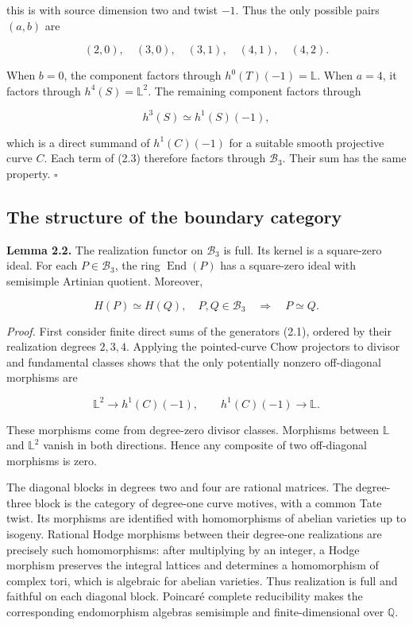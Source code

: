 \documentclass[11pt,a4paper]{article}
\begin{document}
this is \cite[Theorem 1.4(ii), equation (3)]{FV21} with source dimension two and twist $-1$. Thus the only possible pairs $(a,b)$ are

\begin{equation*}
(2,0),\quad(3,0),\quad(3,1),\quad(4,1),\quad(4,2).
\end{equation*}

When $b=0$, the component factors through $h^0(T)(-1)=\mathbb L$. When $a=4$, it factors through $h^4(S)=\mathbb L^2$. The remaining component factors through

\begin{equation*}
h^3(S)\simeq h^1(S)(-1),
\end{equation*}

which is a direct summand of $h^1(C)(-1)$ for a suitable smooth projective curve $C$. Each term of (2.3) therefore factors through $\mathcal B_3$. Their sum has the same property. $\square$

\subsection{The structure of the boundary category}

\noindent \textbf{Lemma 2.2.} The realization functor on $\mathcal B_3$ is full. Its kernel is a square-zero ideal. For each $P\in\mathcal B_3$, the ring $\operatorname{End}(P)$ has a square-zero ideal with semisimple Artinian quotient. Moreover,

\begin{equation*}
H(P)\simeq H(Q),\quad P,Q\in\mathcal B_3
\quad\Longrightarrow\quad P\simeq Q.
\end{equation*}

\noindent \emph{Proof.} First consider finite direct sums of the generators (2.1), ordered by their realization degrees $2,3,4$. Applying the pointed-curve Chow projectors to divisor and fundamental classes shows that the only potentially nonzero off-diagonal morphisms are

\begin{equation*}
\mathbb L^2\longrightarrow h^1(C)(-1),
\qquad
h^1(C)(-1)\longrightarrow\mathbb L.
\tag{2.4}
\end{equation*}

These morphisms come from degree-zero divisor classes. Morphisms between $\mathbb L$ and $\mathbb L^2$ vanish in both directions. Hence any composite of two off-diagonal morphisms is zero.

The diagonal blocks in degrees two and four are rational matrices. The degree-three block is the category of degree-one curve motives, with a common Tate twist. Its morphisms are identified with homomorphisms of abelian varieties up to isogeny. Rational Hodge morphisms between their degree-one realizations are precisely such homomorphisms: after multiplying by an integer, a Hodge morphism preserves the integral lattices and determines a homomorphism of complex tori, which is algebraic for abelian varieties. Thus realization is full and faithful on each diagonal block. Poincaré complete reducibility makes the corresponding endomorphism algebras semisimple and finite-dimensional over $\mathbb Q$.
\end{document}

